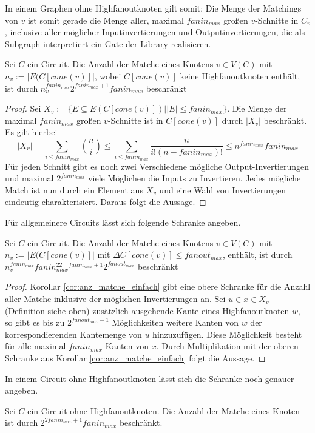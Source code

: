 \documentclass[11pt, a4paper, german]{article}
\begin{document}
In einem Graphen ohne Highfanoutknoten gilt somit: 
Die Menge der Matchings von $v$ ist somit gerade die Menge aller, maximal $fanin_{max}$ großen $v$-Schnitte in $\bar{C}_v$, inclusive aller möglicher Inputinvertierungen und Outputinvertierungen, die als Subgraph interpretiert ein Gate der Library realisieren.
\begin{cor}\label{cor:anz_matche_einfach}
Sei $C$ ein Circuit. Die Anzahl der Matche eines Knotens $v\in V(C)$ mit $n_v := |E(C[cone(v)]|$, wobei $C[cone(v)]$ keine Highfanoutknoten enthält, ist durch $n_v^{fanin_{max}} 2^{fanin_{max}+1} fanin_{max}$ beschränkt
\end{cor}
\begin{proof}
Sei  $X_v:= \{ E \subseteq E(C[cone(v)]) | |E|\leq fanin_{max}  \}$. Die Menge der maximal $fanin_{max}$ großen $v$-Schnitte ist in $C[cone(v)]$ durch $ |X_v|$ beschränkt. Es gilt hierbei \[ |X_v| = \sum\limits_{i \leq fanin_{max}} \binom{n}{i} \leq  \sum\limits_{i \leq fanin_{max}}\frac{n}{i!(n-fanin_{max})!} \leq n^{fanin_{max}} fanin_{max} \]
Für jeden Schnitt gibt es noch zwei Verschiedene mögliche Output-Invertierungen und maximal  $2^{fanin_{max}}$ viele Möglichen die Inputs zu Invertieren. Jedes mögliche Match ist nun durch ein Element aus $X_v$ und eine Wahl von Invertierungen eindeutig charakterisiert. Daraus folgt die Aussage.
\end{proof}
Für allgemeinere Circuits lässt sich folgende Schranke angeben. 
\begin{cor}\label{cor:anzahl_matche_bel}
Sei $C$ ein Circuit. Die Anzahl der Matche eines Knotens $v\in V(C)$ mit $n_v := |E(C[cone(v)]|$ mit $\Delta C[cone(v)] \leq fanout_{max}$, enthält, ist durch $n_v^{fanin_{max}} fanin_{max}^22^{fanin_{max}+1}2^{fanout_{max}}$ beschränkt
\end{cor}
\begin{proof}
Korollar \ref{cor:anz_matche_einfach} gibt eine obere Schranke für die Anzahl aller Matche inklusive der möglichen Invertierungen an. Sei $u \in x \in X_v$ (Definition siehe oben) zusätzlich ausgehende Kante eines Highfanoutknoten $w$, so gibt es bis zu $2^{fanout_{max}-1}$ Möglichkeiten weitere Kanten von $w$ der korrespondierenden Kantemenge von $u$ hinzuzufügen.  Diese Möglichkeit besteht für alle maximal $fanin_{max}$ Kanten von $x$. Durch Multiplikation mit der oberen Schranke aus Korollar \ref{cor:anz_matche_einfach} folgt die Aussage.
\end{proof}
In einem Circuit ohne Highfanoutknoten lässt sich die Schranke noch genauer angeben. 
\begin{cor}\label{cor:anz_matche_einfach_genauer}
Sei $C$ ein Circuit ohne Highfanoutknoten. Die Anzahl der Matche eines Knoten ist durch $2^{2fanin_{max} +1}fanin_{max}$ beschränkt.
\end{cor}
\end{document}
